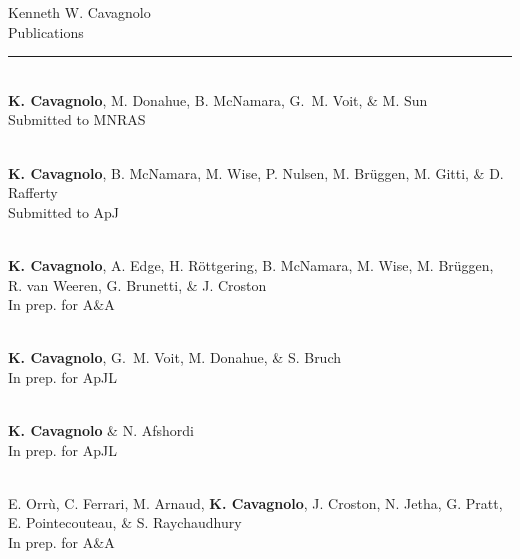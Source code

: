 \documentclass[11pt]{cv}
\begin{document}
\begin{center}
{\Large Kenneth W. Cavagnolo\\Publications}
\rule{\linewidth}{1pt}
\normalsize
\end{center}

\begin{llist}
\vspace{-0.5cm}


{}\\
{\bf K. Cavagnolo}, M. Donahue, B. McNamara, G.~M. Voit, \& M. Sun\\
Submitted to MNRAS

{}\\
{\bf K. Cavagnolo}, B. McNamara, M. Wise, P. Nulsen, M. Br\"uggen, M. Gitti, \& D. Rafferty\\
Submitted to ApJ



{}\\
{\bf{K. Cavagnolo}}, A. Edge, H. R\"ottgering, B. McNamara, M. Wise, M. Br\"uggen, R. van Weeren, G. Brunetti, \& J. Croston\\
In prep. for A\&A

{}\\
{\bf K. Cavagnolo}, G.~M. Voit, M. Donahue, \& S. Bruch\\
In prep. for ApJL

{}\\
{\bf K. Cavagnolo} \& N. Afshordi\\
In prep. for ApJL

{}\\
E. Orr\`u, C. Ferrari, M. Arnaud, {\bf K. Cavagnolo}, J. Croston, N. Jetha, G. Pratt, E. Pointecouteau, \& S. Raychaudhury\\
In prep. for A\&A


\end{llist}
\end{document}
